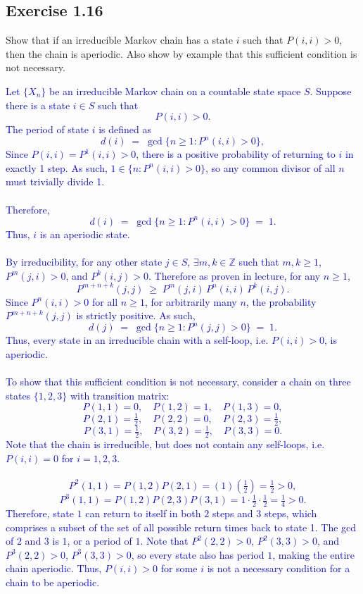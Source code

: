 \documentclass{article}
\begin{document}
\subsection*{Exercise 1.16} Show that if an irreducible Markov chain has a state $i$ such that $P(i, i) > 0$, then the chain
is aperiodic. Also show by example that this sufficient condition is not necessary.

\textcolor{blue}{
Let $\{X_n\}$ be an irreducible Markov chain on a countable state space $S$. Suppose there is a state $i \in S$ such that
\[
    P(i,i) > 0.
\]
The period of state $i$ is defined as
\[
    d(i) \;=\; \gcd \{ n \ge 1 : P^n(i,i) > 0 \},
\]
Since $P(i,i) = P^1(i,i)> 0$, there is a positive probability of returning to $i$ in exactly 1 step. As such, $1 \in \{n: P^n(i,i) > 0\}$, so any common divisor of all $n$ must trivially divide 1. \\ \\ Therefore,
\[
    d(i) \;=\; \gcd \{ n \ge 1 : P^n(i,i) > 0 \} \;=\; 1.
\]
Thus, $i$ is an aperiodic state. \\ \\ 
By irreducibility, for any other state $j \in S$, $\exists m,k \in \mathbb{Z}$ such that $ m,k\ge 1$, $P^m(j,i) > 0$, and $P^k(i,j) > 0$. Therefore as proven in lecture, for any $n \ge 1$,
\[
    P^{m+n+k}(j,j) 
    \;\ge\; P^m(j,i) \, P^n(i,i) \, P^k(i,j).
\]
Since $P^n(i,i) > 0$ for all $n \ge 1$, for arbitrarily many $n$, the probability $P^{m+n+k}(j,j)$ is strictly positive. As such,
\[
    d(j) \;=\; \gcd\{ n \ge 1 : P^n(j,j) > 0 \} \;=\; 1.
\]
Thus, every state in an irreducible chain with a self-loop, i.e. $P(i,i) > 0$, is aperiodic. \\ \\ 
To show that this sufficient condition is not necessary, consider a chain on three states $\{1,2,3\}$ with transition matrix:
\[
    P(1,1)=0, \quad P(1,2)=1, \quad P(1,3)=0, 
\]
\[
    P(2,1)=\tfrac{1}{2}, \quad P(2,2)=0, \quad P(2,3)=\tfrac{1}{2},
\]
\[
    P(3,1)=\tfrac{1}{2}, \quad P(3,2)=\tfrac{1}{2}, \quad P(3,3)=0.
\]
Note that the chain is irreducible, but does not contain any self-loops, i.e. $P(i,i)=0$ for $i=1,2,3$. \\ \\ 
\[
    P^2(1,1) = P(1,2)P(2,1) = (1)\left(\tfrac{1}{2}\right) = \tfrac{1}{2} > 0,
\]
\[
    P^3(1,1) = P(1,2)P(2,3)P(3,1) = 1 \cdot \tfrac{1}{2} \cdot \tfrac{1}{2}
    = \tfrac{1}{4} > 0.
\]
Therefore, state $1$ can return to itself in both $2$ steps and $3$ steps, which comprises a subset of the set of all possible return times back to state 1. The gcd of $2$ and $3$ is $1$, or a period of $1$. 
Note that $P^2(2,2)>0$, $P^2(3,3)>0$, and $P^3(2,2)>0$, $P^3(3,3)>0$, so every state also has period $1$, making the entire chain aperiodic.
Thus, $P(i,i) > 0$ for some $i$ is not a necessary condition for a chain to be aperiodic.
}
\end{document}
